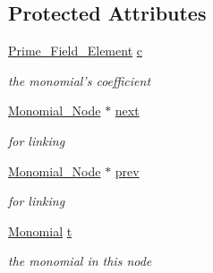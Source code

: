 \subsection*{Protected Attributes}
\begin{DoxyCompactItemize}
\item 
\mbox{\label{class_monomial___node_aa1dcb82900a21ba573517b727a84dd27}} 
\hyperlink{class_prime___field___element}{Prime\+\_\+\+Field\+\_\+\+Element} \hyperlink{class_monomial___node_aa1dcb82900a21ba573517b727a84dd27}{c}
\begin{DoxyCompactList}\small\item\em the monomial's coefficient \end{DoxyCompactList}\item 
\mbox{\label{class_monomial___node_a21f0bb73c29eb42438c6ecc0262947bf}} 
\hyperlink{class_monomial___node}{Monomial\+\_\+\+Node} $\ast$ \hyperlink{class_monomial___node_a21f0bb73c29eb42438c6ecc0262947bf}{next}
\begin{DoxyCompactList}\small\item\em for linking \end{DoxyCompactList}\item 
\mbox{\label{class_monomial___node_a7f2913a95e35d7c0e7d8fd04968f9ed1}} 
\hyperlink{class_monomial___node}{Monomial\+\_\+\+Node} $\ast$ \hyperlink{class_monomial___node_a7f2913a95e35d7c0e7d8fd04968f9ed1}{prev}
\begin{DoxyCompactList}\small\item\em for linking \end{DoxyCompactList}\item 
\mbox{\label{class_monomial___node_af30c51160297f65bb77d063e8e0ecaa6}} 
\hyperlink{class_monomial}{Monomial} \hyperlink{class_monomial___node_af30c51160297f65bb77d063e8e0ecaa6}{t}
\begin{DoxyCompactList}\small\item\em the monomial in this node \end{DoxyCompactList}\end{DoxyCompactItemize}
